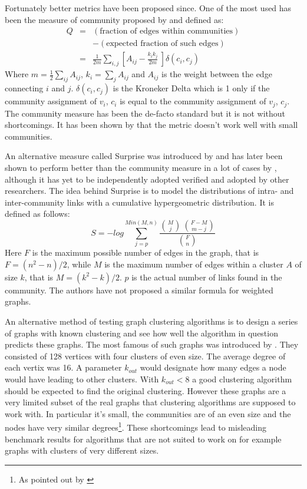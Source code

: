 Fortunately better metrics have been proposed since. One of the most 
used has been the measure of community proposed by \cite{girvan2002} and 
defined as:
\begin{eqnarray}
	Q & = & (\mbox{fraction of edges within communities}) \\
	  & & - (\mbox{expected fraction of such edges}) \\
	& = & \frac{1}{2m} \sum_{i,j} \left[ A_{ij} - \frac{k_i k_j}{2m} \
\right] \delta(c_i, c_j)
\end{eqnarray}
Where $m=\frac{1}{2} \sum_{ij} A_{ij}$, $k_i = \sum_j A_{ij}$ and 
$A_{ij}$ is the weight between the edge connecting $i$ and $j$.  
$\delta(c_i, c_j)$ is the Kroneker Delta which is 1 only if the 
community assignment of $v_i$, $c_i$ is equal to the community 
assignment of $v_j$, $c_j$. The community measure has been the de-facto 
standard but it is not without shortcomings. It has been shown by 
\cite{brandes2007} that the metric doesn't work well with small 
communities.

An alternative measure called Surprise was introduced by 
\cite{arnau2005} and has later been shown to perform better than the 
community measure in a lot of cases by \cite{aldecoa2011}, although it 
has yet to be independently adopted verified and adopted by other 
researchers. The idea behind Surprise is to model the distributions of 
intra- and inter-community links with a cumulative hypergeometric 
distribution. It is defined as follows:
\begin{equation}
	S = -log \sum_{j=p}^{Min(M,n)} \frac{\binom{M}{j} \
	\binom{F-M}{m-j}}{\binom{F}{n}}
\end{equation}
Here $F$ is the maximum possible number of edges in the graph, that is 
$F = (n^2-n)/2$, while $M$ is the maximum number of edges within a 
cluster $A$ of size $k$, that is $M = (k^2-k)/2$. $p$ is the actual 
number of links found in the community. The authors have not proposed a 
similar formula for weighted graphs.

An alternative method of testing graph clustering algorithms is to 
design a series of graphs with known clustering and see how well the 
algorithm in question predicts these graphs. The most famous of such 
graphs was introduced by \cite{girvan2002}. They consisted of 128 
vertices with four clusters of even size. The average degree of each 
vertix was 16. A parameter $k_{out}$ would designate how many edges a 
node would have leading to other clusters. With $k_{out} < 8$ a good 
clustering algorithm should be expected to find the original clustering.  
However these graphs are a very limited subset of the real graphs that 
clustering algorithms are supposed to work with. In particular it's 
small, the communities are of an even size and the nodes have very 
similar degrees\footnote{As pointed out by \cite{lancichinetti2008}}. 
These shortcomings lead to misleading benchmark results for algorithms 
that are not suited to work on for example graphs with clusters of very 
different sizes.

